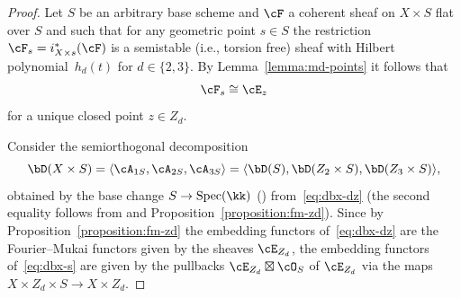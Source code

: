 \documentclass[11pt]{amsart}
\DeclareMathOperator{\Spec}{\mathrm{Spec}}
\theoremstyle{plain}
\theoremstyle{definition}
\theoremstyle{remark}
\begin{document}
\begin{proof}
Let $S$ be an arbitrary base scheme and $\cF$ a coherent sheaf on $X \times S$ flat over $S$ and such that 
for any geometric point $s \in S$ the restriction $\cF_s = i_{X \times s}^*(\cF)$ is a semistable (i.e., torsion free) sheaf with Hilbert polynomial~$h_d(t)$ for $d \in \{2,3\}$.
By Lemma~\ref{lemma:md-points} it follows that 
\begin{equation*}
\cF_s \cong \cE_z 
\end{equation*}
for a unique closed point $z \in Z_d$.

Consider the semiorthogonal decomposition
\begin{equation}\label{eq:dbx-s}
\bD(X \times S) = \langle \cA_{1S}, \cA_{2S}, \cA_{3S} \rangle = \langle \bD(S), \bD(Z_2 \times S), \bD(Z_3 \times S) \rangle,
\end{equation}
obtained by the base change $S \to \Spec(\kk)$ (\cite[Theorem~5.6]{kuznetsov2011base}) from~\eqref{eq:dbx-dz} 
(the second equality follows from \cite[Theorem~6.4]{kuznetsov2011base} and Proposition~\ref{proposition:fm-zd}).
Since by Proposition~\ref{proposition:fm-zd} the embedding functors of~\eqref{eq:dbx-dz} are the Fourier--Mukai functors given by the sheaves $\cE_{Z_d}$,
the embedding functors of~\eqref{eq:dbx-s} are given by the pullbacks $\cE_{Z_d} \boxtimes \cO_S$ of $\cE_{Z_d}$ via the maps $X \times Z_d \times S \to X \times Z_d$.


\end{proof}
\end{document}
